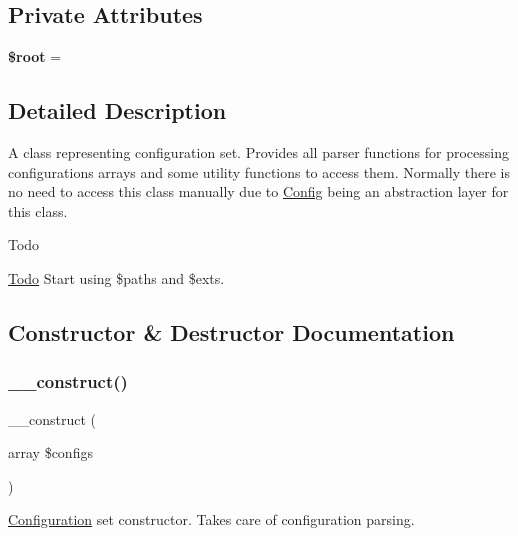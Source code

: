\subsection*{Private Attributes}
\begin{DoxyCompactItemize}
\item 
\mbox{\label{class_lora_1_1_configuration_ab37f7c32f41c3c61ed940887453767f4}} 
{\bfseries \$root} = \textquotesingle{}\textquotesingle{}
\end{DoxyCompactItemize}


\subsection{Detailed Description}
A class representing configuration set. Provides all parser functions for processing configurations arrays and some utility functions to access them. Normally there is no need to access this class manually due to \hyperlink{class_lora_1_1_config}{Config} being an abstraction layer for this class.

\begin{DoxyRefDesc}{Todo}
\item[\hyperlink{todo__todo000001}{Todo}]Start using \$paths and \$exts. \end{DoxyRefDesc}


\subsection{Constructor \& Destructor Documentation}
\mbox{\label{class_lora_1_1_configuration_a4bebb34aeb3da161d6c92f4bbcf09123}} 
\subsubsection{\texorpdfstring{\+\_\+\+\_\+construct()}{\_\_construct()}}
{\footnotesize\ttfamily \+\_\+\+\_\+construct (\begin{DoxyParamCaption}\item[{array}]{\$configs }\end{DoxyParamCaption})}

\hyperlink{class_lora_1_1_configuration}{Configuration} set constructor. Takes care of configuration parsing. 


